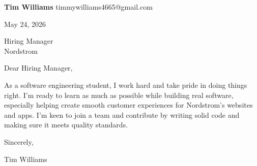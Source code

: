 \documentclass[12pt]{article}
\begin{document}
\textbf{Tim Williams} \hfill timmywilliams4665@gmail.com

\vspace{1em}

May 24, 2026

\vspace{1em}

Hiring Manager \\
Nordstrom

\vspace{1em}

Dear Hiring Manager,

As a software engineering student, I work hard and take pride in doing things right. I'm ready to learn as much as possible while building real software, especially helping create smooth customer experiences for Nordstrom's websites and apps. I'm keen to join a team and contribute by writing solid code and making sure it meets quality standards.

\vspace{1em}

Sincerely,

\vspace{2em}

Tim Williams
\end{document}
